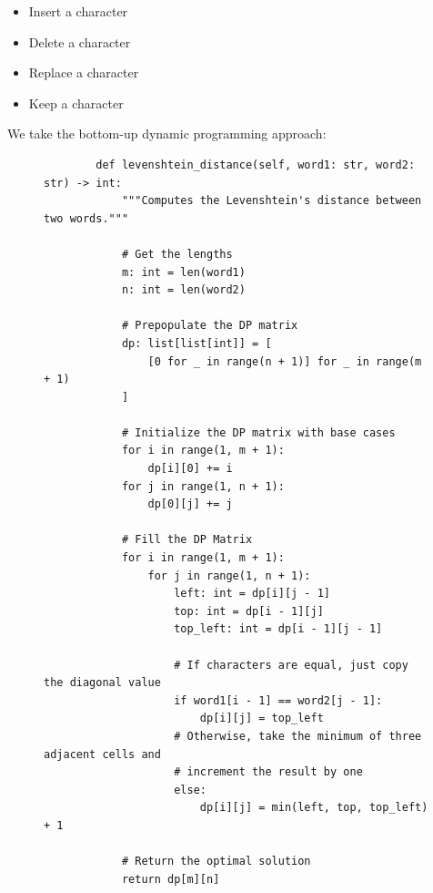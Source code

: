 \documentclass[11pt]{article}
\begin{document}
\begin{itemize}
    \item Insert a character
    \item Delete a character
    \item Replace a character
    \item Keep a character
\end{itemize}

We take the bottom-up dynamic programming approach:

\begin{figure}[H]
    \centering
    \begin{verbatim}
        def levenshtein_distance(self, word1: str, word2: str) -> int:
            """Computes the Levenshtein's distance between two words."""

            # Get the lengths
            m: int = len(word1)
            n: int = len(word2)

            # Prepopulate the DP matrix
            dp: list[list[int]] = [
                [0 for _ in range(n + 1)] for _ in range(m + 1)
            ]

            # Initialize the DP matrix with base cases
            for i in range(1, m + 1):
                dp[i][0] += i
            for j in range(1, n + 1):
                dp[0][j] += j

            # Fill the DP Matrix
            for i in range(1, m + 1):
                for j in range(1, n + 1):
                    left: int = dp[i][j - 1]
                    top: int = dp[i - 1][j]
                    top_left: int = dp[i - 1][j - 1]

                    # If characters are equal, just copy the diagonal value
                    if word1[i - 1] == word2[j - 1]:
                        dp[i][j] = top_left
                    # Otherwise, take the minimum of three adjacent cells and
                    # increment the result by one
                    else:
                        dp[i][j] = min(left, top, top_left) + 1

            # Return the optimal solution
            return dp[m][n]
    \end{verbatim}
\end{figure}

\end{document}
